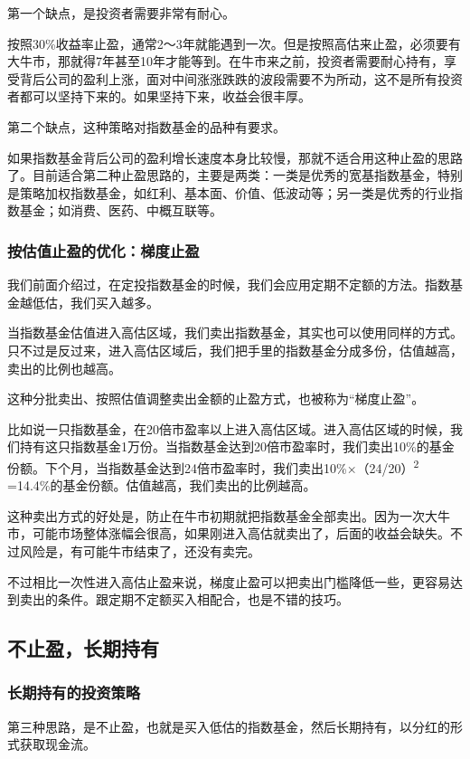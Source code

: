 第一个缺点，是投资者需要非常有耐心。

按照30\%收益率止盈，通常2～3年就能遇到一次。但是按照高估来止盈，必须要有大牛市，那就得7年甚至10年才能等到。在牛市来之前，投资者需要耐心持有，享受背后公司的盈利上涨，面对中间涨涨跌跌的波段需要不为所动，这不是所有投资者都可以坚持下来的。如果坚持下来，收益会很丰厚。

第二个缺点，这种策略对指数基金的品种有要求。

如果指数基金背后公司的盈利增长速度本身比较慢，那就不适合用这种止盈的思路了。目前适合第二种止盈思路的，主要是两类：一类是优秀的宽基指数基金，特别是策略加权指数基金，如红利、基本面、价值、低波动等；另一类是优秀的行业指数基金；如消费、医药、中概互联等。

\subsubsection{按估值止盈的优化：梯度止盈}

我们前面介绍过，在定投指数基金的时候，我们会应用定期不定额的方法。指数基金越低估，我们买入越多。

当指数基金估值进入高估区域，我们卖出指数基金，其实也可以使用同样的方式。只不过是反过来，进入高估区域后，我们把手里的指数基金分成多份，估值越高，卖出的比例也越高。

这种分批卖出、按照估值调整卖出金额的止盈方式，也被称为“梯度止盈”。

比如说一只指数基金，在20倍市盈率以上进入高估区域。进入高估区域的时候，我们持有这只指数基金1万份。当指数基金达到20倍市盈率时，我们卖出10\%的基金份额。下个月，当指数基金达到24倍市盈率时，我们卖出10\%×（24/20）\textsuperscript{2} =14.4\%的基金份额。估值越高，我们卖出的比例越高。

这种卖出方式的好处是，防止在牛市初期就把指数基金全部卖出。因为一次大牛市，可能市场整体涨幅会很高，如果刚进入高估就卖出了，后面的收益会缺失。不过风险是，有可能牛市结束了，还没有卖完。

不过相比一次性进入高估止盈来说，梯度止盈可以把卖出门槛降低一些，更容易达到卖出的条件。跟定期不定额买入相配合，也是不错的技巧。

\subsection{不止盈，长期持有}
\subsubsection{长期持有的投资策略}

第三种思路，是不止盈，也就是买入低估的指数基金，然后长期持有，以分红的形式获取现金流。

